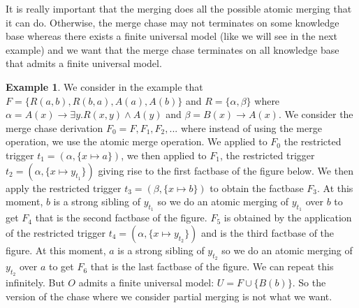 \documentclass{article}
\theoremstyle{definition}
\newtheorem{example}{Example}[section]
\theoremstyle{remark}
\begin{document}
It is really important that the merging does all the possible atomic merging that it can do. Otherwise, the merge chase may not terminates on some knowledge base whereas there exists a finite universal model (like we will see in the next example) and we want that the merge chase terminates on all knowledge base that admits a finite universal model. 

\begin{example}
We consider in the example that $F= \{R(a,b),R(b,a),A(a),A(b)\}$ and $R = \{\alpha, \beta\}$ where $\alpha = A(x) \rightarrow \exists y.R(x,y) \wedge A(y)$ and $\beta=B(x) \rightarrow A(x)$. We consider the merge chase derivation $F_0 =F,F_1,F_2,...$ where instead of using the merge operation, we use the atomic merge operation. We applied to $F_0$ the restricted trigger $t_1 = (\alpha, \{x \mapsto a\})$, we then applied to $F_1$, the restricted trigger $t_2 = (\alpha, \{x \mapsto y_{t_1}\})$ giving rise to the first factbase of the figure below. We then apply the restricted trigger $t_3 = (\beta, \{x \mapsto b\})$ to obtain the factbase $F_3$. At this moment, $b$ is a strong sibling of $y_{t_1}$ so we do an atomic merging of $y_{t_1}$ over $b$ to get $F_4$ that is the second factbase of the figure. $F_5$ is obtained by the application of the restricted trigger $t_4 = (\alpha, \{x \mapsto y_{t_2}\})$ and is the third factbase of the figure. At this moment, $a$ is a strong sibling of $y_{t_2}$ so we do an atomic merging of $y_{t_2}$ over $a$ to get $F_6$ that is the last factbase of the figure. We can repeat this infinitely. But $O$ admits a finite universal model: $U = F \cup \{B(b)\}$. So the version of the chase where we consider partial merging is not what we want.



\end{example}
\end{document}
